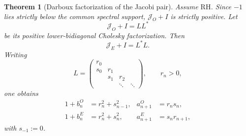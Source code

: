 \documentclass[preprint,12pt]{elsarticle}
\numberwithin{equation}{section}
\theoremstyle{plain}
\newtheorem{theorem}{Theorem}[section]
\theoremstyle{definition}
\theoremstyle{remark}
\newcommand{\RH}{\mathrm{RH}}
\begin{document}
\begin{theorem}[Darboux factorization of the Jacobi pair]
\label{thm:Darboux_factorization}
Assume $\RH$.  Since $-1$ lies strictly below the common spectral support, $\mathcal J_O+I$ is strictly positive.  Let
\begin{equation}
\mathcal J_O+I=LL^*
\label{eq:JO_Cholesky_Darboux}
\end{equation}
be its positive lower-bidiagonal Cholesky factorization.  Then
\begin{equation}
\mathcal J_E+I=L^*L.
\label{eq:JE_Darboux_partner}
\end{equation}
Writing
\begin{equation}
L=
\begin{pmatrix}
r_0&&&\\
s_0&r_1&&\\
&s_1&r_2&\\
&&\ddots&\ddots
\end{pmatrix},
\qquad r_n>0,
\label{eq:Darboux_bidiagonal_L}
\end{equation}
one obtains
\begin{align}
1+b_n^O&=r_n^2+s_{n-1}^2,
& a_{n+1}^O&=r_ns_n,
\label{eq:Darboux_O_coefficients}\\
1+b_n^E&=r_n^2+s_n^2,
& a_{n+1}^E&=s_nr_{n+1},
\label{eq:Darboux_E_coefficients}
\end{align}
with $s_{-1}:=0$.
\end{theorem}
\end{document}

